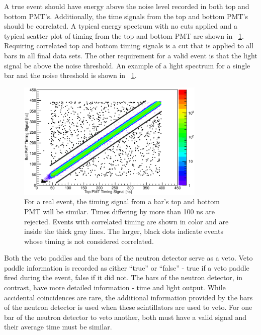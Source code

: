 A true event should have energy above the noise level recorded in both top and bottom PMT's.  Additionally, the time signals from the top and bottom PMT's should be correlated.  A typical energy spectrum with no cuts applied and a typical scatter plot of timing from the top and bottom PMT are shown in {\fig}~\ref{fig:realEvent}.  Requiring correlated top and bottom timing signals is a cut that is applied to all bars in all final data sets.  The other requirement for a valid event is that the light signal be above the noise threshold.  An example of a light spectrum for a single bar and the noise threshold is shown in {\fig}~\ref{fig:realEvent}.
\begin{figure}[!htbp]
\centering
\includegraphics[width=0.8\textwidth]{figures/realTiming.eps}
\caption{For a real event, the timing signal from a bar's top and bottom PMT will be similar.  Times differing by more than 100 ns are rejected.  Events with correlated timing are shown in color and are inside the thick gray lines.  The larger, black dots indicate events whose timing is not considered correlated.}
\label{fig:realEvent}
\end{figure}

Both the veto paddles and the bars of the neutron detector serve as a veto.  Veto paddle information is recorded as either ``true'' or ``false'' - true if a veto paddle fired during the event, false if it did not.  The bars of the neutron detector, in contrast, have more detailed information - time and light output.  While accidental coincidences are rare, the additional information provided by the bars of the neutron detector is used when these scintillators are used to veto.  For one bar of the neutron detector to veto another, both must have a valid signal and their average time must be similar.

